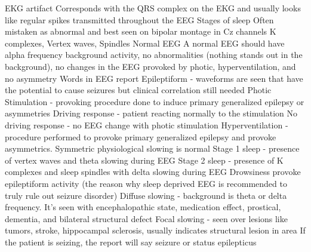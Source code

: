\documentclass{article}
\begin{document}
EKG artifact 
Corresponds with the QRS complex on the EKG and usually looks like regular spikes transmitted throughout the EEG
Stages of sleep
Often mistaken as abnormal and best seen on bipolar montage in Cz channels
K complexes, Vertex waves, Spindles
Normal EEG
A normal EEG should have alpha frequency background activity, no abnormalities (nothing stands out in the background), no changes in the EEG provoked by photic, hyperventilation, and no asymmetry  
Words in EEG report 
Epileptiform - waveforms are seen that have the potential to cause seizures but clinical correlation still needed
Photic Stimulation - provoking procedure done to induce primary generalized epilepsy or asymmetries 
Driving response - patient reacting normally to the stimulation 
No driving response - no EEG change with photic stimulation 
Hyperventilation - procedure performed to provoke primary generalized epilepsy and provoke asymmetrics. Symmetric physiological slowing is normal 
 Stage 1 sleep - presence of vertex waves and theta slowing during EEG
Stage 2 sleep - presence of K complexes and sleep spindles with delta slowing during EEG
Drowsiness provoke epileptiform activity (the reason why sleep deprived EEG is recommended to truly rule out seizure disorder)
Diffuse slowing - background is theta or delta frequency. It’s seen with encephalopathic state, medication effect, prostical, dementia, and bilateral structural defect
Focal slowing - seen over lesions like tumors, stroke, hippocampal sclerosis, usually indicates structural lesion in area
If the patient is seizing, the report will say seizure or status epilepticus 
\end{document}
